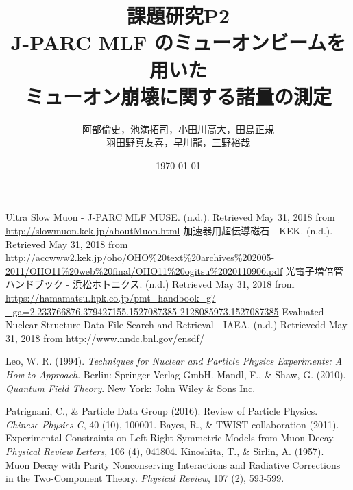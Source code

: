 \documentclass[titlepage]{jsarticle}
\begin{document}
\title{課題研究P2\\J-PARC MLF  のミューオンビームを用いた\\ミューオン崩壊に関する諸量の測定}
\author{阿部倫史，池満拓司，小田川高大，田島正規\\羽田野真友喜，早川龍，三野裕哉}
\date{\today}
\maketitle
\tableofcontents
\newpage
%









\newpage
\appendix



\begin{thebibliography}{99}
 Ultra Slow Muon - J-PARC MLF MUSE. (n.d.). Retrieved May 31, 2018
  from \url{http://slowmuon.kek.jp/aboutMuon.html}
 加速器用超伝導磁石 - KEK. (n.d.). Retrieved May 31, 2018
  from \url{http://accwww2.kek.jp/oho/OHO\%20text\%20archives\%202005-2011/OHO11\%20web\%20final/OHO11\%20ogitsu\%2020110906.pdf}
 光電子増倍管ハンドブック - 浜松ホトニクス. (n.d.) Retrieved May 31, 2018
  from \url{https://hamamatsu.hpk.co.jp/pmt_handbook_g?\_ga=2.233766876.379427155.1527087385-2128085973.1527087385}
 Evaluated Nuclear Structure Data File Search and Retrieval - IAEA. (n.d.) Retrievedd May 31, 2018
  from \url{http://www.nndc.bnl.gov/ensdf/}
  
 Leo, W. R. (1994). \textit{Techniques for Nuclear and Particle Physics Experiments: A How-to Approach}. Berlin: Springer-Verlag GmbH.
 Mandl, F., \& Shaw, G. (2010). \textit{Quantum Field Theory}. New York: John Wiley \& Sons Inc.

 Patrignani, C., \&  Particle Data Group (2016). Review of Particle Physics. \textit{Chinese Physics C}, 40 (10), 100001.
 Bayes, R., \& TWIST collaboration (2011). Experimental Constraints on Left-Right Symmetric Models from Muon Decay. \textit{Physical Review Letters}, 106 (4), 041804.
 Kinoshita, T., \& Sirlin, A. (1957). Muon Decay with Parity Nonconserving Interactions and Radiative Corrections in the Two-Component Theory. \textit{Physical Review}, 107 (2), 593-599.

\end{thebibliography} 
\end{document}
